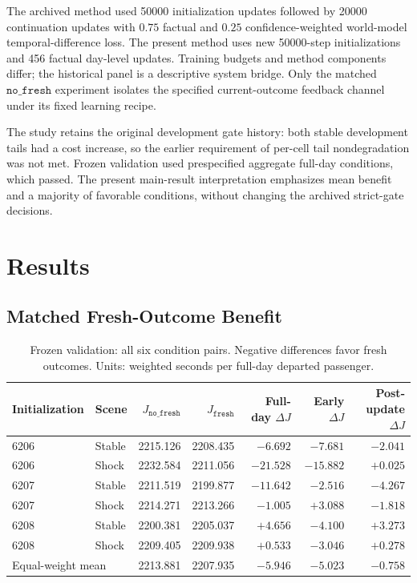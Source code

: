 \documentclass[journal]{IEEEtran}
\newcommand{\nf}{\texttt{no\_fresh}}
\newcommand{\fresh}{\texttt{fresh}}
\begin{document}
The archived method used 50000 initialization updates followed by 20000 continuation updates with $0.75$ factual and $0.25$ confidence-weighted world-model temporal-difference loss. The present method uses new 50000-step initializations and 456 factual day-level updates. Training budgets and method components differ; the historical panel is a descriptive system bridge. Only the matched $\nf$ experiment isolates the specified current-outcome feedback channel under its fixed learning recipe.

The study retains the original development gate history: both stable development tails had a cost increase, so the earlier requirement of per-cell tail nondegradation was not met. Frozen validation used prespecified aggregate full-day conditions, which passed. The present main-result interpretation emphasizes mean benefit and a majority of favorable conditions, without changing the archived strict-gate decisions.

\section{Results}
\subsection{Matched Fresh-Outcome Benefit}
\begin{table}[t]
\centering\caption{Frozen validation: all six condition pairs. Negative differences favor fresh outcomes. Units: weighted seconds per full-day departed passenger.}
\label{tab:validation}
\begin{tabular}{llrrrrr}\toprule
Initialization & Scene & $J_{\nf}$ & $J_{\fresh}$ & Full-day $\Delta J$ & Early $\Delta J$ & Post-update $\Delta J$\\\midrule
6206 & Stable & 2215.126 & 2208.435 & $-6.692$ & $-7.681$ & $-2.041$\\
6206 & Shock & 2232.584 & 2211.056 & $-21.528$ & $-15.882$ & $+0.025$\\
6207 & Stable & 2211.519 & 2199.877 & $-11.642$ & $-2.516$ & $-4.267$\\
6207 & Shock & 2214.271 & 2213.266 & $-1.005$ & $+3.088$ & $-1.818$\\
6208 & Stable & 2200.381 & 2205.037 & $+4.656$ & $-4.100$ & $+3.273$\\
6208 & Shock & 2209.405 & 2209.938 & $+0.533$ & $-3.046$ & $+0.278$\\\midrule
\multicolumn{2}{l}{Equal-weight mean} & 2213.881 & 2207.935 & $\mathbf{-5.946}$ & $-5.023$ & $-0.758$\\\bottomrule
\end{tabular}
\end{table}
\end{document}
